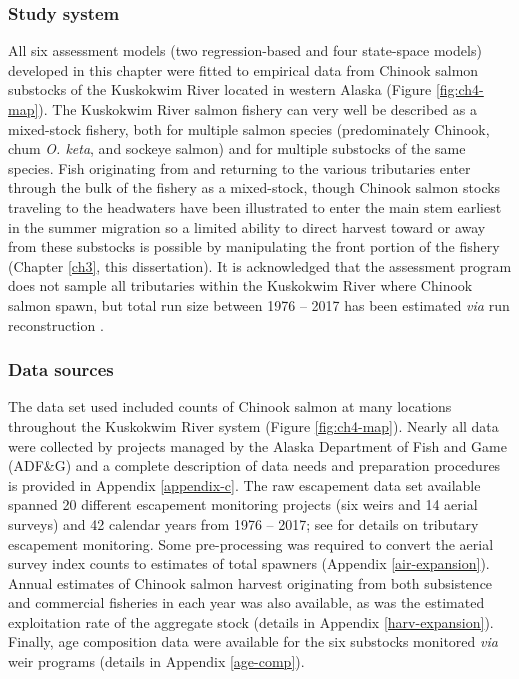\documentclass[12pt,]{book}
\theoremstyle{definition}
\theoremstyle{definition}
\theoremstyle{definition}
\theoremstyle{remark}
\begin{document}
\subsubsection{Study system}\label{study-system}

\noindent
All six assessment models (two regression-based and four state-space
models) developed in this chapter were fitted to empirical data from
Chinook salmon substocks of the Kuskokwim River located in western
Alaska (Figure \ref{fig:ch4-map}). The Kuskokwim River salmon fishery
can very well be described as a mixed-stock fishery, both for multiple
salmon species (predominately Chinook, chum \emph{O. keta}, and sockeye
salmon) and for multiple substocks of the same species. Fish originating
from and returning to the various tributaries enter through the bulk of
the fishery as a mixed-stock, though Chinook salmon stocks traveling to
the headwaters have been illustrated to enter the main stem earliest in
the summer migration \citep{smith-liller-2017a, smith-liller-2017b} so a
limited ability to direct harvest toward or away from these substocks is
possible by manipulating the front portion of the fishery (Chapter
\ref{ch3}, this dissertation). It is acknowledged that the assessment
program does not sample all tributaries within the Kuskokwim River where
Chinook salmon spawn, but total run size between 1976 -- 2017 has been
estimated \emph{via} run reconstruction \citep{liller-etal-2018}.

\subsubsection{Data sources}\label{data-sources}

\noindent
The data set used included counts of Chinook salmon at many locations
throughout the Kuskokwim River system (Figure \ref{fig:ch4-map}). Nearly
all data were collected by projects managed by the Alaska Department of
Fish and Game (ADF\&G) and a complete description of data needs and
preparation procedures is provided in Appendix \ref{appendix-c}. The raw
escapement data set available spanned 20 different escapement monitoring
projects (six weirs and 14 aerial surveys) and 42 calendar years from
1976 -- 2017; see \citet{head-smith-2018} for details on tributary
escapement monitoring. Some pre-processing was required to convert the
aerial survey index counts to estimates of total spawners (Appendix
\ref{air-expansion}). Annual estimates of Chinook salmon harvest
originating from both subsistence and commercial fisheries in each year
was also available, as was the estimated exploitation rate of the
aggregate stock (details in Appendix \ref{harv-expansion}). Finally, age
composition data were available for the six substocks monitored
\emph{via} weir programs (details in Appendix \ref{age-comp}).
\end{document}
